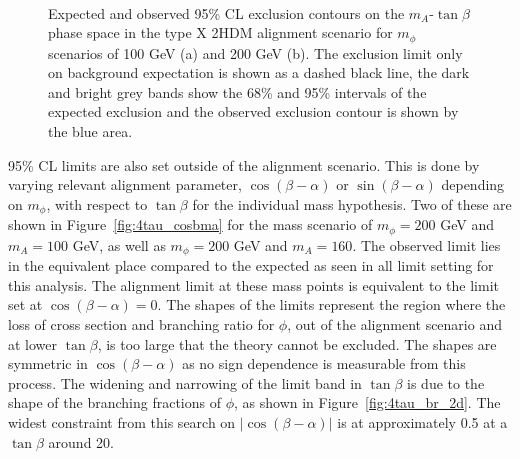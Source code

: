 \begin{figure}[!hbtp]
\centering
     \\
\caption{Expected and observed 95\% CL exclusion contours on the $m_{A}$-$\tan\beta$ phase space in the type X 2HDM alignment scenario for $m_{\phi}$ scenarios of 100 GeV (a) and 200 GeV (b). The exclusion limit only on background expectation is shown as a dashed black line, the dark and bright grey bands show the 68\% and 95\% intervals of the expected exclusion and the observed exclusion contour is shown by the blue area.}
\label{fig:4tau_md}
\end{figure}

95\% \ac{CL} limits are also set outside of the alignment scenario.
This is done by varying relevant alignment parameter, $\cos(\beta-\alpha)$ or $\sin(\beta-\alpha)$ depending on $m_\phi$, with respect to $\tan\beta$ for the individual mass hypothesis.
Two of these are shown in Figure~\ref{fig:4tau_cosbma} for the mass scenario of $m_{\phi} = 200$ GeV and $m_{A} = 100$ GeV, as well as $m_{\phi} = 200$ GeV and $m_{A} = 160$.
The observed limit lies in the equivalent place compared to the expected as seen in all limit setting for this analysis.
The alignment limit at these mass points is equivalent to the limit set at $\cos(\beta-\alpha) = 0$.
The shapes of the limits represent the region where the loss of cross section and branching ratio for $\phi$, out of the alignment scenario and at lower $\tan\beta$, is too large that the theory cannot be excluded.
The shapes are symmetric in $\cos(\beta-\alpha)$ as no sign dependence is measurable from this process.
The widening and narrowing of the limit band in $\tan\beta$ is due to the shape of the branching fractions of $\phi$, as shown in Figure~\ref{fig:4tau_br_2d}.
The widest constraint from this search on $|\cos(\beta-\alpha)|$ is at approximately 0.5 at a $\tan\beta$ around 20.

